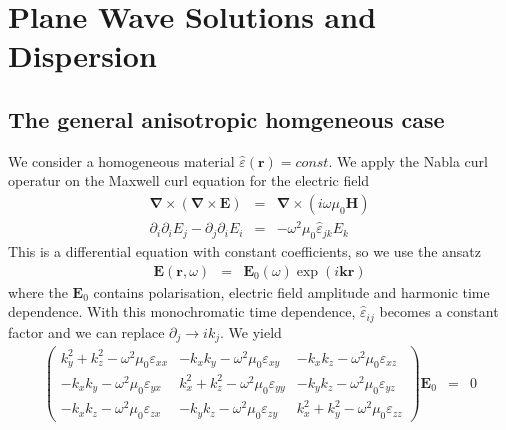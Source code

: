 \documentclass[12pt,a4paper,twoside,openright,BCOR10mm,headsepline,titlepage,abstracton,chapterprefix,final]{scrreprt}
\newcommand\Vector[1]{{\mathbf{#1}}}
\newcommand\vacuum{0}
\newcommand\Location{\Vector{r}}
\newcommand\wavenumber{k}
\newcommand\Wavevector{\Vector{\wavenumber}}
\newcommand\Nabla{\Vector{\nabla}}
\newcommand\Tensor[1]{\hat{#1}}
\newcommand\scalarEfield{E}
\newcommand\scalarHfield{H}
\newcommand\Efield{\Vector{\scalarEfield}}
\newcommand\Hfield{\Vector{\scalarHfield}}
\newcommand\vacuumpermeability{\scalarpermeability_{\vacuum}}
\newcommand\scalarpermeability{\mu}
\newcommand\permittivity{\Tensor{\scalarpermittivity}}
\newcommand\scalarpermittivity{\varepsilon}
\begin{document}
\section{Plane Wave Solutions and Dispersion}
\subsection{The general anisotropic homgeneous case}
We consider a homogeneous material $\permittivity(\Location) = const.$ We apply the Nabla curl operatur on the Maxwell curl equation for the electric field
\begin{eqnarray}
  \Nabla \times ( \Nabla \times \Efield ) &=& \Nabla \times ( i \omega \vacuumpermeability \Hfield ) 
  \\
  \partial_i \partial_i \scalarEfield_j - \partial_j \partial_i \scalarEfield_i &=& - \omega^2 \vacuumpermeability \permittivity_{jk} \scalarEfield_{k}
\end{eqnarray}
This is a differential equation with constant coefficients, so we use the ansatz
\begin{eqnarray}
 \Efield(\Location,\omega) &=& \Efield_0(\omega) \exp(i \Wavevector \Location)
\end{eqnarray}
where the $\Efield_0$ contains polarisation, electric field amplitude and harmonic time dependence.
With this monochromatic time dependence, $\permittivity_{ij}$ becomes a constant factor 
and we can replace $\partial_j \to i k_j$. We yield
\begin{eqnarray}
\begin{pmatrix}
 \wavenumber_y^2 + \wavenumber_z^2 - \omega^2 \vacuumpermeability \scalarpermittivity_{xx} 
 &
 - \wavenumber_x \wavenumber_y - \omega^2 \vacuumpermeability \scalarpermittivity_{xy}
 &
 - \wavenumber_x \wavenumber_z - \omega^2 \vacuumpermeability \scalarpermittivity_{xz}
 \\
 - \wavenumber_x \wavenumber_y - \omega^2 \vacuumpermeability \scalarpermittivity_{yx}
 &
 \wavenumber_x^2 + \wavenumber_z^2 - \omega^2 \vacuumpermeability \scalarpermittivity_{yy} 
 &
 - \wavenumber_y \wavenumber_z - \omega^2 \vacuumpermeability \scalarpermittivity_{yz}
 \\
 - \wavenumber_x \wavenumber_z - \omega^2 \vacuumpermeability \scalarpermittivity_{zx}
 &
 - \wavenumber_y \wavenumber_z - \omega^2 \vacuumpermeability \scalarpermittivity_{zy}
 &
 \wavenumber_x^2 + \wavenumber_y^2 - \omega^2 \vacuumpermeability \scalarpermittivity_{zz}  
\end{pmatrix}
\Efield_0
&=& 0 \label{eq:generalDispersionEigenEquation}
\end{eqnarray}
\end{document}
